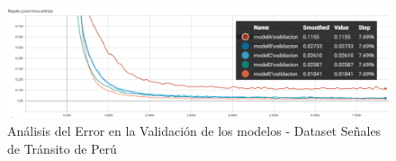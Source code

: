 			\begin{figure}[H]
				\includegraphics[width=1\textwidth, height=\textheight,keepaspectratio]{images/desarrollo/trainResults/peruSummary_validError} 
				\begin{center}
				\caption{\small{Análisis del Error en la Validación de los modelos - Dataset Señales de Tránsito de Perú}}
				
				{\small{\fontsize{10}{16.8}\selectfont {Fuente: Elaboración propia}}}
				\end{center}
				\vspace{-1.5em}
			\end{figure}